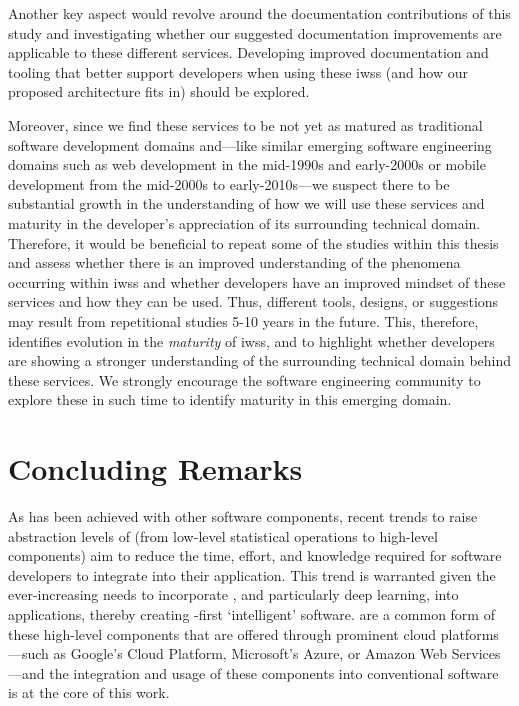 Another key aspect would revolve around the documentation contributions of this study and investigating whether our suggested documentation improvements are applicable to these different services. Developing improved documentation and tooling that better support developers when using these \glspl{iws} (and how our proposed architecture fits in) should be explored. 

Moreover, since we find these services to be not yet as matured as traditional software development domains and---like similar emerging software engineering domains such as web development in the mid-1990s and early-2000s or mobile development from the mid-2000s to early-2010s---we suspect there to be substantial growth in the understanding of how we will use these services and maturity in the developer's appreciation of its surrounding technical domain. Therefore, it would be beneficial to repeat some of the studies within this thesis and assess whether there is an improved understanding of the phenomena occurring within \glspl{iws} and whether developers have an improved mindset of these services and how they can be used. Thus, different tools, designs, or suggestions may result from repetitional studies 5-10 years in the future. This, therefore, identifies evolution in the \textit{maturity} of \glspl{iws}, and to highlight whether developers are showing a stronger understanding of the surrounding technical domain behind these services. We strongly encourage the software engineering community to explore these in such time to identify maturity in this emerging domain.


\section{Concluding Remarks}

As has been achieved with other software components, recent trends to raise abstraction levels of  (from low-level statistical operations to high-level  components) aim to reduce the time, effort, and knowledge required for software developers to integrate  into their application. This trend is warranted given the ever-increasing needs to incorporate , and particularly deep learning, into applications, thereby creating -first `intelligent' software.  are a common form of these high-level  components that are offered through prominent cloud platforms---such as Google's Cloud Platform, Microsoft's Azure, or Amazon Web Services---and the integration and usage of these components into conventional software is at the core of this work.


